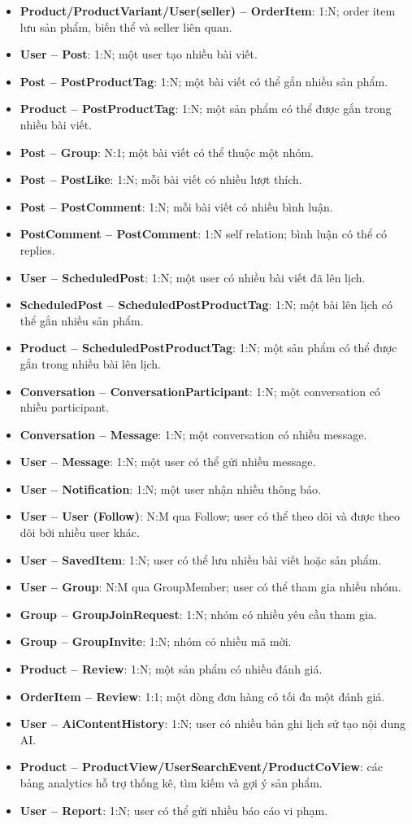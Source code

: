 \begin{itemize}
  \item \textbf{Product/ProductVariant/User(seller) -- OrderItem}: 1:N; order item lưu sản phẩm, biến thể và seller liên quan.
  \item \textbf{User -- Post}: 1:N; một user tạo nhiều bài viết.
  \item \textbf{Post -- PostProductTag}: 1:N; một bài viết có thể gắn nhiều sản phẩm.
  \item \textbf{Product -- PostProductTag}: 1:N; một sản phẩm có thể được gắn trong nhiều bài viết.
  \item \textbf{Post -- Group}: N:1; một bài viết có thể thuộc một nhóm.
  \item \textbf{Post -- PostLike}: 1:N; mỗi bài viết có nhiều lượt thích.
  \item \textbf{Post -- PostComment}: 1:N; mỗi bài viết có nhiều bình luận.
  \item \textbf{PostComment -- PostComment}: 1:N self relation; bình luận có thể có replies.
  \item \textbf{User -- ScheduledPost}: 1:N; một user có nhiều bài viết đã lên lịch.
  \item \textbf{ScheduledPost -- ScheduledPostProductTag}: 1:N; một bài lên lịch có thể gắn nhiều sản phẩm.
  \item \textbf{Product -- ScheduledPostProductTag}: 1:N; một sản phẩm có thể được gắn trong nhiều bài lên lịch.
  \item \textbf{Conversation -- ConversationParticipant}: 1:N; một conversation có nhiều participant.
  \item \textbf{Conversation -- Message}: 1:N; một conversation có nhiều message.
  \item \textbf{User -- Message}: 1:N; một user có thể gửi nhiều message.
  \item \textbf{User -- Notification}: 1:N; một user nhận nhiều thông báo.
  \item \textbf{User -- User (Follow)}: N:M qua Follow; user có thể theo dõi và được theo dõi bởi nhiều user khác.
  \item \textbf{User -- SavedItem}: 1:N; user có thể lưu nhiều bài viết hoặc sản phẩm.
  \item \textbf{User -- Group}: N:M qua GroupMember; user có thể tham gia nhiều nhóm.
  \item \textbf{Group -- GroupJoinRequest}: 1:N; nhóm có nhiều yêu cầu tham gia.
  \item \textbf{Group -- GroupInvite}: 1:N; nhóm có nhiều mã mời.
  \item \textbf{Product -- Review}: 1:N; một sản phẩm có nhiều đánh giá.
  \item \textbf{OrderItem -- Review}: 1:1; một dòng đơn hàng có tối đa một đánh giá.
  \item \textbf{User -- AiContentHistory}: 1:N; user có nhiều bản ghi lịch sử tạo nội dung AI.
  \item \textbf{Product -- ProductView/UserSearchEvent/ProductCoView}: các bảng analytics hỗ trợ thống kê, tìm kiếm và gợi ý sản phẩm.
  \item \textbf{User -- Report}: 1:N; user có thể gửi nhiều báo cáo vi phạm.
\end{itemize}

